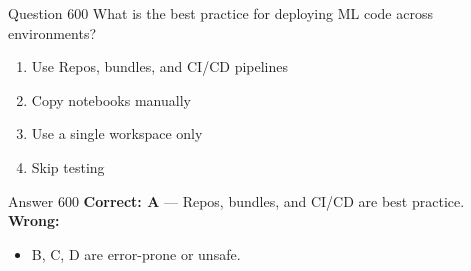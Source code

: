 \documentclass[aspectratio=169,11pt]{beamer}
\begin{document}
	\begin{frame}{Question 600}
		What is the best practice for deploying ML code across environments?
		\begin{enumerate}[label=\Alph*.]
			\item Use Repos, bundles, and CI/CD pipelines
			\item Copy notebooks manually
			\item Use a single workspace only
			\item Skip testing
		\end{enumerate}
	\end{frame}
	\begin{frame}{Answer 600}
		\textbf{Correct: A} --- Repos, bundles, and CI/CD are best practice.\\
		\vspace{0.5em}
		\textbf{Wrong:}
		\begin{itemize}
			\item B, C, D are error-prone or unsafe.
		\end{itemize}
	\end{frame}
	
\end{document}
